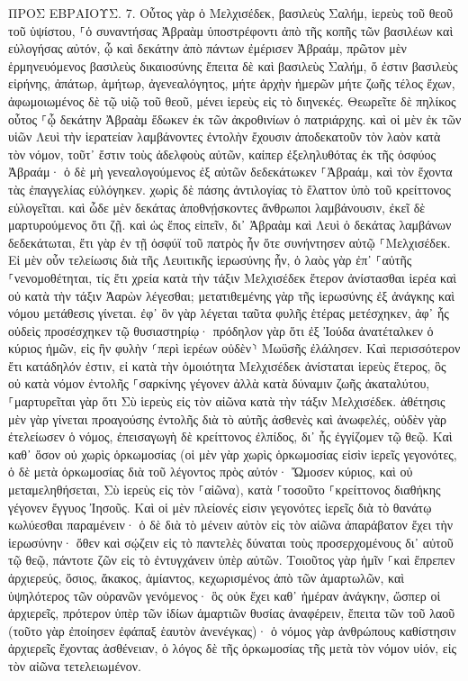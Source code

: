 \documentclass[twoside, 9pt]{extreport}
\begin{document}
ΠΡΟΣ ΕΒΡΑΙΟΥΣ.
7.
Οὗτος γὰρ ὁ Μελχισέδεκ, βασιλεὺς Σαλήμ, ἱερεὺς τοῦ θεοῦ τοῦ ὑψίστου, ⸀ὁ συναντήσας Ἀβραὰμ ὑποστρέφοντι ἀπὸ τῆς κοπῆς τῶν βασιλέων καὶ εὐλογήσας αὐτόν, 
ᾧ καὶ δεκάτην ἀπὸ πάντων ἐμέρισεν Ἀβραάμ, πρῶτον μὲν ἑρμηνευόμενος βασιλεὺς δικαιοσύνης ἔπειτα δὲ καὶ βασιλεὺς Σαλήμ, ὅ ἐστιν βασιλεὺς εἰρήνης, 
ἀπάτωρ, ἀμήτωρ, ἀγενεαλόγητος, μήτε ἀρχὴν ἡμερῶν μήτε ζωῆς τέλος ἔχων, ἀφωμοιωμένος δὲ τῷ υἱῷ τοῦ θεοῦ, μένει ἱερεὺς εἰς τὸ διηνεκές. 
Θεωρεῖτε δὲ πηλίκος οὗτος ⸀ᾧ δεκάτην Ἀβραὰμ ἔδωκεν ἐκ τῶν ἀκροθινίων ὁ πατριάρχης. 
καὶ οἱ μὲν ἐκ τῶν υἱῶν Λευὶ τὴν ἱερατείαν λαμβάνοντες ἐντολὴν ἔχουσιν ἀποδεκατοῦν τὸν λαὸν κατὰ τὸν νόμον, τοῦτ᾽ ἔστιν τοὺς ἀδελφοὺς αὐτῶν, καίπερ ἐξεληλυθότας ἐκ τῆς ὀσφύος Ἀβραάμ· 
ὁ δὲ μὴ γενεαλογούμενος ἐξ αὐτῶν δεδεκάτωκεν ⸀Ἀβραάμ, καὶ τὸν ἔχοντα τὰς ἐπαγγελίας εὐλόγηκεν. 
χωρὶς δὲ πάσης ἀντιλογίας τὸ ἔλαττον ὑπὸ τοῦ κρείττονος εὐλογεῖται. 
καὶ ὧδε μὲν δεκάτας ἀποθνῄσκοντες ἄνθρωποι λαμβάνουσιν, ἐκεῖ δὲ μαρτυρούμενος ὅτι ζῇ. 
καὶ ὡς ἔπος εἰπεῖν, δι᾽ Ἀβραὰμ καὶ Λευὶ ὁ δεκάτας λαμβάνων δεδεκάτωται, 
ἔτι γὰρ ἐν τῇ ὀσφύϊ τοῦ πατρὸς ἦν ὅτε συνήντησεν αὐτῷ ⸀Μελχισέδεκ. 
Εἰ μὲν οὖν τελείωσις διὰ τῆς Λευιτικῆς ἱερωσύνης ἦν, ὁ λαὸς γὰρ ἐπ᾽ ⸀αὐτῆς ⸀νενομοθέτηται, τίς ἔτι χρεία κατὰ τὴν τάξιν Μελχισέδεκ ἕτερον ἀνίστασθαι ἱερέα καὶ οὐ κατὰ τὴν τάξιν Ἀαρὼν λέγεσθαι; 
μετατιθεμένης γὰρ τῆς ἱερωσύνης ἐξ ἀνάγκης καὶ νόμου μετάθεσις γίνεται. 
ἐφ᾽ ὃν γὰρ λέγεται ταῦτα φυλῆς ἑτέρας μετέσχηκεν, ἀφ᾽ ἧς οὐδεὶς προσέσχηκεν τῷ θυσιαστηρίῳ· 
πρόδηλον γὰρ ὅτι ἐξ Ἰούδα ἀνατέταλκεν ὁ κύριος ἡμῶν, εἰς ἣν φυλὴν ⸂περὶ ἱερέων οὐδὲν⸃ Μωϋσῆς ἐλάλησεν. 
Καὶ περισσότερον ἔτι κατάδηλόν ἐστιν, εἰ κατὰ τὴν ὁμοιότητα Μελχισέδεκ ἀνίσταται ἱερεὺς ἕτερος, 
ὃς οὐ κατὰ νόμον ἐντολῆς ⸀σαρκίνης γέγονεν ἀλλὰ κατὰ δύναμιν ζωῆς ἀκαταλύτου, 
⸀μαρτυρεῖται γὰρ ὅτι Σὺ ἱερεὺς εἰς τὸν αἰῶνα κατὰ τὴν τάξιν Μελχισέδεκ. 
ἀθέτησις μὲν γὰρ γίνεται προαγούσης ἐντολῆς διὰ τὸ αὐτῆς ἀσθενὲς καὶ ἀνωφελές, 
οὐδὲν γὰρ ἐτελείωσεν ὁ νόμος, ἐπεισαγωγὴ δὲ κρείττονος ἐλπίδος, δι᾽ ἧς ἐγγίζομεν τῷ θεῷ. 
Καὶ καθ᾽ ὅσον οὐ χωρὶς ὁρκωμοσίας (οἱ μὲν γὰρ χωρὶς ὁρκωμοσίας εἰσὶν ἱερεῖς γεγονότες, 
ὁ δὲ μετὰ ὁρκωμοσίας διὰ τοῦ λέγοντος πρὸς αὐτόν· Ὤμοσεν κύριος, καὶ οὐ μεταμεληθήσεται, Σὺ ἱερεὺς εἰς τὸν ⸀αἰῶνα), 
κατὰ ⸀τοσοῦτο ⸀κρείττονος διαθήκης γέγονεν ἔγγυος Ἰησοῦς. 
Καὶ οἱ μὲν πλείονές εἰσιν γεγονότες ἱερεῖς διὰ τὸ θανάτῳ κωλύεσθαι παραμένειν· 
ὁ δὲ διὰ τὸ μένειν αὐτὸν εἰς τὸν αἰῶνα ἀπαράβατον ἔχει τὴν ἱερωσύνην· 
ὅθεν καὶ σῴζειν εἰς τὸ παντελὲς δύναται τοὺς προσερχομένους δι᾽ αὐτοῦ τῷ θεῷ, πάντοτε ζῶν εἰς τὸ ἐντυγχάνειν ὑπὲρ αὐτῶν. 
Τοιοῦτος γὰρ ἡμῖν ⸀καὶ ἔπρεπεν ἀρχιερεύς, ὅσιος, ἄκακος, ἀμίαντος, κεχωρισμένος ἀπὸ τῶν ἁμαρτωλῶν, καὶ ὑψηλότερος τῶν οὐρανῶν γενόμενος· 
ὃς οὐκ ἔχει καθ᾽ ἡμέραν ἀνάγκην, ὥσπερ οἱ ἀρχιερεῖς, πρότερον ὑπὲρ τῶν ἰδίων ἁμαρτιῶν θυσίας ἀναφέρειν, ἔπειτα τῶν τοῦ λαοῦ (τοῦτο γὰρ ἐποίησεν ἐφάπαξ ἑαυτὸν ἀνενέγκας)· 
ὁ νόμος γὰρ ἀνθρώπους καθίστησιν ἀρχιερεῖς ἔχοντας ἀσθένειαν, ὁ λόγος δὲ τῆς ὁρκωμοσίας τῆς μετὰ τὸν νόμον υἱόν, εἰς τὸν αἰῶνα τετελειωμένον. 
\end{document}
